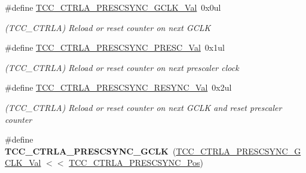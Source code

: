 \begin{DoxyCompactItemize}
\item 
\hypertarget{group___s_a_m_l21___t_c_c_gaf2d05202094bc08043b29e17b07a65b4}{}\#define \hyperlink{group___s_a_m_l21___t_c_c_gaf2d05202094bc08043b29e17b07a65b4}{T\+C\+C\+\_\+\+C\+T\+R\+L\+A\+\_\+\+P\+R\+E\+S\+C\+S\+Y\+N\+C\+\_\+\+G\+C\+L\+K\+\_\+\+Val}~0x0ul\label{group___s_a_m_l21___t_c_c_gaf2d05202094bc08043b29e17b07a65b4}

\begin{DoxyCompactList}\small\item\em (T\+C\+C\+\_\+\+C\+T\+R\+L\+A) Reload or reset counter on next G\+C\+L\+K \end{DoxyCompactList}\item 
\hypertarget{group___s_a_m_l21___t_c_c_ga733366d296f397ce26bc35ec3edf37e7}{}\#define \hyperlink{group___s_a_m_l21___t_c_c_ga733366d296f397ce26bc35ec3edf37e7}{T\+C\+C\+\_\+\+C\+T\+R\+L\+A\+\_\+\+P\+R\+E\+S\+C\+S\+Y\+N\+C\+\_\+\+P\+R\+E\+S\+C\+\_\+\+Val}~0x1ul\label{group___s_a_m_l21___t_c_c_ga733366d296f397ce26bc35ec3edf37e7}

\begin{DoxyCompactList}\small\item\em (T\+C\+C\+\_\+\+C\+T\+R\+L\+A) Reload or reset counter on next prescaler clock \end{DoxyCompactList}\item 
\hypertarget{group___s_a_m_l21___t_c_c_ga25f6ad5567ba0810a52522cc4e0a275d}{}\#define \hyperlink{group___s_a_m_l21___t_c_c_ga25f6ad5567ba0810a52522cc4e0a275d}{T\+C\+C\+\_\+\+C\+T\+R\+L\+A\+\_\+\+P\+R\+E\+S\+C\+S\+Y\+N\+C\+\_\+\+R\+E\+S\+Y\+N\+C\+\_\+\+Val}~0x2ul\label{group___s_a_m_l21___t_c_c_ga25f6ad5567ba0810a52522cc4e0a275d}

\begin{DoxyCompactList}\small\item\em (T\+C\+C\+\_\+\+C\+T\+R\+L\+A) Reload or reset counter on next G\+C\+L\+K and reset prescaler counter \end{DoxyCompactList}\item 
\hypertarget{group___s_a_m_l21___t_c_c_ga7e2c544ec1bb759ba6d6257bfe9b9d13}{}\#define {\bfseries T\+C\+C\+\_\+\+C\+T\+R\+L\+A\+\_\+\+P\+R\+E\+S\+C\+S\+Y\+N\+C\+\_\+\+G\+C\+L\+K}~(\hyperlink{group___s_a_m_l21___t_c_c_gaf2d05202094bc08043b29e17b07a65b4}{T\+C\+C\+\_\+\+C\+T\+R\+L\+A\+\_\+\+P\+R\+E\+S\+C\+S\+Y\+N\+C\+\_\+\+G\+C\+L\+K\+\_\+\+Val}  $<$$<$ \hyperlink{group___s_a_m_l21___t_c_c_ga779b0a47e8b363609fc5d3f20c62288a}{T\+C\+C\+\_\+\+C\+T\+R\+L\+A\+\_\+\+P\+R\+E\+S\+C\+S\+Y\+N\+C\+\_\+\+Pos})\label{group___s_a_m_l21___t_c_c_ga7e2c544ec1bb759ba6d6257bfe9b9d13}


\end{DoxyCompactItemize}
